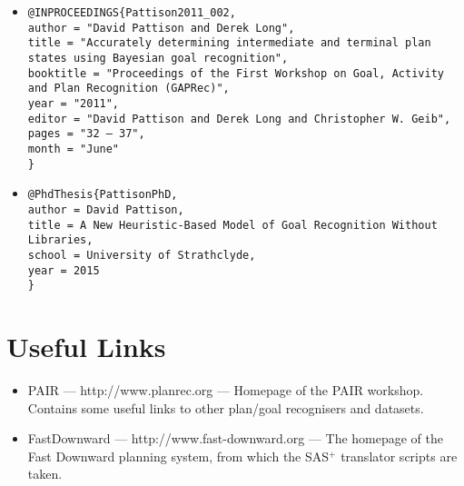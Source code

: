 \documentclass[10pt,a4paper]{article}
\begin{document}
\begin{itemize}


\item \texttt{@INPROCEEDINGS\{Pattison2011\_002,\\
	author = "David Pattison and Derek Long",\\
	title = "Accurately determining intermediate and terminal plan states using {B}ayesian goal recognition",\\
	booktitle = "Proceedings of the First Workshop on Goal, Activity and Plan Recognition {(GAPRec)}",\\
	year = "2011",\\
	editor = "David Pattison and Derek Long and Christopher W. Geib",\\
	pages = "32 -- 37",\\
	month = "June"\\
\}
}

\item \texttt{@PhdThesis\{PattisonPhD,\\
author = {David Pattison},\\
title = {A New Heuristic-Based Model of Goal Recognition Without Libraries},\\
school = {University of Strathclyde},\\
year = {2015}\\
\}
}



\end{itemize}


\section{Useful Links}

\begin{itemize}

\item PAIR --- http://www.planrec.org --- Homepage of the PAIR workshop. Contains some useful links to other plan/goal recognisers and datasets.

\item FastDownward --- http://www.fast-downward.org --- The homepage of the Fast Downward planning system, from which the SAS$^+$ translator scripts are taken.

\end{itemize}




\end{document}
